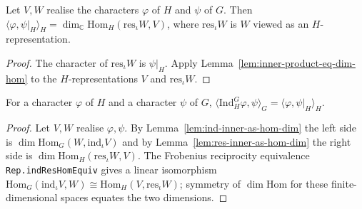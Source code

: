 \begin{lemma}
    \label{lem:res-inner-as-hom-dim}
    \leanok
    Let $V, W$ realise the characters $\varphi$ of $H$ and $\psi$ of $G$. Then
    $\langle \varphi, \psi|_H\rangle_H = \dim_{\mathbb{C}}
    \mathrm{Hom}_H(\mathrm{res}_\iota W, V)$, where $\mathrm{res}_\iota W$ is $W$
    viewed as an $H$-representation.
\end{lemma}
\begin{proof}
    The character of $\mathrm{res}_\iota W$ is $\psi|_H$. Apply
    Lemma~\ref{lem:inner-product-eq-dim-hom} to the $H$-representations $V$ and
    $\mathrm{res}_\iota W$.
\end{proof}

\begin{lemma}
    \label{lem:frobenius-reciprocity-char}
    For a character $\varphi$ of $H$ and a character $\psi$ of $G$,
    $\langle \mathrm{Ind}_H^G \varphi, \psi \rangle_G =
    \langle \varphi, \psi|_H \rangle_H$.
\end{lemma}
\begin{proof}
    Let $V, W$ realise $\varphi, \psi$. By
    Lemma~\ref{lem:ind-inner-as-hom-dim} the left side is $\dim
    \mathrm{Hom}_G(W, \mathrm{ind}_\iota V)$ and by
    Lemma~\ref{lem:res-inner-as-hom-dim} the right side is $\dim
    \mathrm{Hom}_H(\mathrm{res}_\iota W, V)$. The Frobenius reciprocity
    equivalence \texttt{Rep.indResHomEquiv} gives a linear isomorphism
    $\mathrm{Hom}_G(\mathrm{ind}_\iota V, W) \cong \mathrm{Hom}_H(V,
    \mathrm{res}_\iota W)$; symmetry of $\dim\mathrm{Hom}$ for these
    finite-dimensional spaces equates the two dimensions.
\end{proof}

